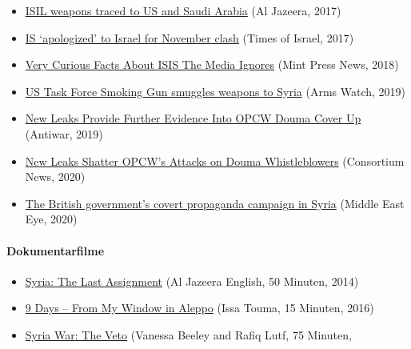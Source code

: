 \begin{itemize}
{  commandos save Islamic Militants from Syria} (Daily Mail, 2015)
\item
  \href{https://www.aljazeera.com/news/2017/12/isil-weapons-traced-saudi-arabia-171214164431586.html}{ISIL
  weapons traced to US and Saudi Arabia} (Al Jazeera, 2017)
\item
  \href{https://www.timesofisrael.com/ex-defense-minister-says-is-apologized-to-israel-for-november-clash/}{IS
  `apologized' to Israel for November clash} (Times of Israel, 2017)
\item
  \href{https://www.mintpressnews.com/10-curious-facts-isis-media-ignores/236996/}{Very
  Curious Facts About ISIS The Media Ignores} (Mint Press News, 2018)
\item
  \href{http://armswatch.com/us-task-force-smoking-gun-smuggles-weapons-to-syria-serbia-files-part-2/}{US
  Task Force Smoking Gun smuggles weapons to Syria} (Arms Watch, 2019)
\item
  \href{https://original.antiwar.com/dave_decamp/2019/12/15/new-leaks-provide-further-evidence-into-opcw-douma-cover-up/}{New
  Leaks Provide Further Evidence Into OPCW Douma Cover Up} (Antiwar,
  2019)
\item
  \href{https://consortiumnews.com/2020/02/11/new-leaks-shatter-opcws-attacks-on-douma-whistleblowers/}{New
  Leaks Shatter OPCW's Attacks on Douma Whistleblowers} (Consortium
  News, 2020)
\item
  \href{https://www.middleeasteye.net/news/revealed-british-government-covert-propaganda-campaign-syria}{The
  British government's covert propaganda campaign in Syria} (Middle East
  Eye, 2020)
\end{itemize}

\hypertarget{dokumentarfilme}{%
\paragraph{Dokumentarfilme}\label{dokumentarfilme}}

\begin{itemize}
\tightlist
\item
  \href{https://www.youtube.com/watch?v=sRtyJitvg7U}{Syria: The Last
  Assignment} (Al Jazeera English, 50 Minuten, 2014)
\item
  \href{https://www.youtube.com/watch?v=THdMj0-LmRw}{9 Days -- From My
  Window in Aleppo} (Issa Touma, 15 Minuten, 2016)
\item
  \href{https://www.youtube.com/watch?v=5VMTfkP0jSQ}{Syria War: The
  Veto} (Vanessa Beeley and Rafiq Lutf, 75 Minuten,
\end{itemize}

